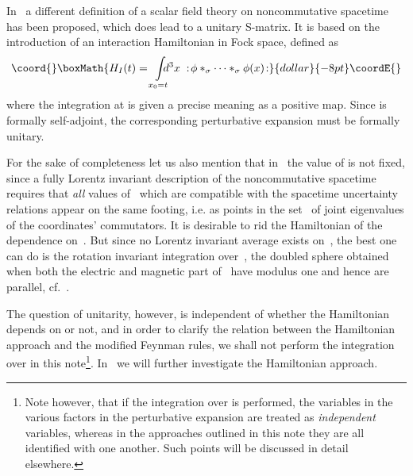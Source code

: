 \documentclass[a4paper,twoside,12pt]{article}
\begin{document}
In~\cite{dfr} a different definition of a scalar field theory on noncommutative
spacetime has been proposed, which does lead to a unitary S-matrix. It is based
on the introduction of an interaction Hamiltonian in Fock space, defined as 
$$\coord{}\boxMath{
H_I(t)=\int\limits_{x_0=t} \hspace{-8pt} d^3x \;
:\!\phi*_\sigma\dots*_\sigma \phi (x)\!:
}{dollar}{-8pt}\coordE{}$$
where the integration at \coordHE{} is given a precise meaning as a positive map.
Since \coordHE{} is  formally self-adjoint, the corresponding perturbative
expansion must be formally unitary. 

For the sake of  completeness  let us also mention that in~\cite{dfr} the value
of \myHighlight{$\sigma$}\coordHE{} is not fixed, since a fully Lorentz invariant description of the
noncommutative spacetime requires that {\sl all} values of~\myHighlight{$\sigma$}\coordHE{} which are
compatible with the spacetime uncertainty relations appear on the same footing,
i.e. as points in the set~\myHighlight{$\Sigma$}\coordHE{} of joint eigenvalues of the coordinates'
commutators. It is desirable to rid the Hamiltonian of the dependence
on~\myHighlight{$\Sigma$}\coordHE{}. But since no  Lorentz  invariant average exists on~\myHighlight{$\Sigma$}\coordHE{}, the
best one can do is the rotation invariant integration over~\coordHE{}, the
doubled sphere obtained when both the electric and magnetic part of~\myHighlight{$\sigma$}\coordHE{}
have modulus one and hence are parallel, cf.~\cite{dfr}. 

The question of unitarity, however, is independent of whether the Hamiltonian
depends on \myHighlight{$\Sigma$}\coordHE{} or not, and in order to clarify the relation between the
Hamiltonian approach and the modified Feynman rules, we shall not perform
the integration over \coordHE{} in this note\footnote{Note
however, that if the integration over \coordHE{} is performed, the \myHighlight{$\sigma$}\coordHE{}
variables in the various factors \coordHE{} in the perturbative expansion are
treated as {\sl independent} variables, whereas in the approaches outlined in
this note they are all identified with one another. Such points will be
discussed in detail elsewhere.}. In~\cite{BDFP} we will further investigate the
Hamiltonian approach.
\end{document}
